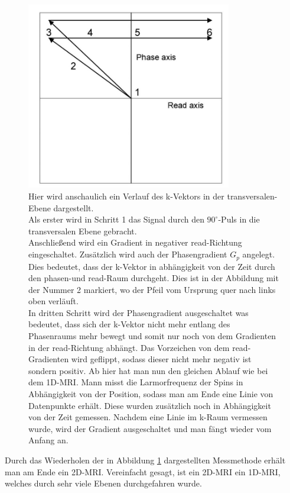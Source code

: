\begin{figure}[H]
    \centering
    \includegraphics[width = 0.8\textwidth]{Abbildungen/2DMRI.JPG}
    \caption[Veranschaulichter Verlauf des k-Vektors im 2D-MRI]{Hier wird anschaulich ein Verlauf des k-Vektors in der transversalen-Ebene dargestellt.\\
    Als erster wird in Schritt 1 das Signal durch den $90^{\circ}$-Puls in die transversalen Ebene gebracht.\\
    Anschließend wird ein Gradient in negativer read-Richtung eingeschaltet. Zusätzlich wird auch der Phasengradient $G_p$ angelegt. Dies bedeutet, dass der k-Vektor in abhängigkeit von der Zeit durch den phasen-und read-Raum durchgeht. Dies ist in der Abbildung mit der Nummer 2 markiert, wo der Pfeil vom Ursprung quer nach links oben verläuft.\\
    In dritten Schritt wird der Phasengradient ausgeschaltet was bedeutet, dass sich der k-Vektor nicht mehr entlang des Phasenraums mehr bewegt und somit nur noch von dem Gradienten in der read-Richtung abhängt. Das Vorzeichen von dem read-Gradienten wird geflippt, sodass dieser nicht mehr negativ ist sondern positiv. Ab hier hat man nun den gleichen Ablauf wie bei dem 1D-MRI. Mann misst die Larmorfrequenz der Spins in Abhängigkeit von der Position, sodass man am Ende eine Linie von Datenpunkte erhält. Diese wurden  zusätzlich noch in Abhängigkeit von der Zeit gemessen. Nachdem eine Linie im k-Raum vermessen wurde, wird der Gradient ausgeschaltet und man fängt wieder vom Anfang an.\\ \cite{Schmidt}}
    \label{fig:2DMRIk}
\end{figure}
Durch das Wiederholen der in Abbildung \ref{fig:2DMRIk} dargestellten Messmethode erhält man am Ende ein 2D-MRI. Vereinfacht gesagt, ist ein 2D-MRI ein 1D-MRI, welches durch sehr viele Ebenen durchgefahren wurde.

